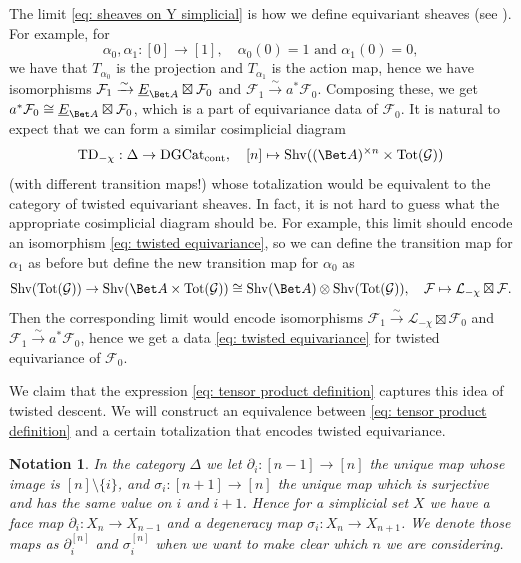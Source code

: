 \documentclass[10pt]{amsart}
\newtheorem{nota}[subsubsection]{Notation}
\theoremstyle{remark}
\newcommand{\te}{\text}
\newcommand{\pa}{\partial}
\newcommand{\ul}{\underline}
\newcommand{\on}{\operatorname}
\newcommand{\cF}{\mathcal{F}}
\newcommand{\cG}{\mathcal{G}}
\newcommand{\cL}{\mathcal{L}}
\newcommand{\DGcat}{\on{DGCat}_{\on{cont}}}
\newcommand{\Shv}{\on{Shv}}
\begin{document}
The limit \eqref{eq: sheaves on Y simplicial} is how we define equivariant sheaves (see \cite[Appendix B]{BL}). For example, for
\[\alpha_0,\alpha_1:[0]\rightarrow [1],\quad \alpha_0(0)=1 \te{ and }\alpha_1(0)=0,\]
we have that $T_{\alpha_0}$ is the projection and $T_{\alpha_1}$ is the action map, hence we have isomorphisms $\cF_1\xrightarrow{\sim}\ul{E}_{\Bet A}\boxtimes\cF_0$ and $\cF_1\xrightarrow{\sim} a^*\cF_0$. Composing these, we get $a^*\cF_0\cong \ul{E}_{\Bet A}\boxtimes \cF_0$, which is a part of equivariance data of $\cF_0$. It is natural to expect that we can form a similar cosimplicial diagram
\begin{equation}\label{eq: TD chi}
    \on{TD}_{-\chi}:\Delta\rightarrow \DGcat,\quad [n]\mapsto \Shv((\Bet A)^{\times n}\times\on{Tot}(\cG))
\end{equation}
(with different transition maps!)
whose totalization would be equivalent to the category of twisted equivariant sheaves. In fact, it is not hard to guess what the appropriate cosimplicial diagram should be. For example, this limit should encode an isomorphism \eqref{eq: twisted equivariance}, so we can define the transition map for $\alpha_1$ as before but define the new transition map for $\alpha_0$ as
\[\Shv(\on{Tot}(\cG))\rightarrow \Shv(\Bet A\times \on{Tot}(\cG))\cong \Shv(\Bet A)\otimes \Shv(\on{Tot}(\cG)),\quad \cF\mapsto \cL_{-\chi}\boxtimes\cF.\]
Then the corresponding limit would encode isomorphisms $\cF_1\xrightarrow{\sim}\cL_{-\chi}\boxtimes \cF_0$ and  $\cF_1\xrightarrow{\sim}a^*\cF_0$, hence we get a data \eqref{eq: twisted equivariance} for twisted equivariance of $\cF_0$.
\medskip

We claim that the expression \eqref{eq: tensor product definition} captures this idea of twisted descent. We will construct an equivalence between \eqref{eq: tensor product definition} and a certain totalization that encodes twisted equivariance.

\begin{nota}
    In the category $\Delta$ we let $\pa_i:[n-1]\rightarrow [n]$ the unique map whose image is $[n]\setminus \{i\}$, and $\sigma_i:[n+1]\rightarrow [n]$ the unique map which is surjective and has the same value on $i$ and $i+1$. Hence for a simplicial set $X$ we have a face map $\pa_i:X_n\rightarrow X_{n-1}$ and a degeneracy map $\sigma_i:X_n\rightarrow X_{n+1}$. We denote those maps as $\pa^{[n]}_i$ and $\sigma^{[n]}_i$ when we want to make clear which $n$ we are considering.
\end{nota}
\end{document}
